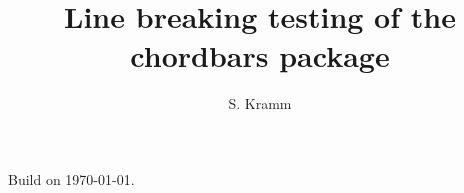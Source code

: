 \documentclass[12pt]{article}
\title{Line breaking testing of the chordbars package}
\author{S. Kramm}
\begin{document}
\countbarsYes

\songtitle



Build on \today.

\def\barsize{1.5}%
\def\chordFontSize{\large\bfseries}


\begin{chordbar}{5}{}
\repeatBar
\repeatBar
\repeatBar
\repeatBar
\end{chordbar}

\begin{chordbar}{6}{}
\repeatBar
\repeatBar
\repeatBar
\repeatBar
\end{chordbar}

\begin{chordbar}{6}{}
\repeatBarPair
\repeatBarPair
\end{chordbar}
\end{document}
